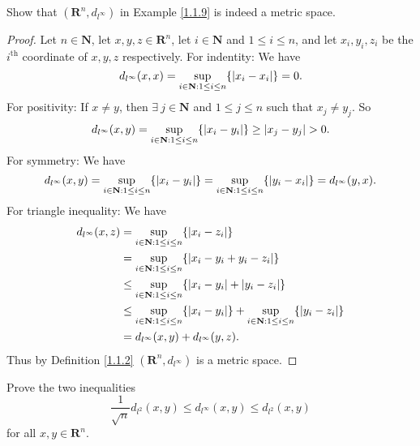 \begin{exercise}\label{ex 1.1.9}
    Show that \((\mathbf{R}^n, d_{l^\infty})\) in Example \ref{1.1.9} is indeed a metric space.
\end{exercise}

\begin{proof}
    Let \(n \in \mathbf{N}\), let \(x, y, z \in \mathbf{R}^n\), let \(i \in \mathbf{N}\) and \(1 \leq i \leq n\), and let \(x_i, y_i, z_i\) be the \(i^{\text{th}}\) coordinate of \(x, y, z\) respectively.
    For indentity:
    We have
    \[
        d_{l^\infty}(x, x) = \sup_{i \in \mathbf{N} : 1 \leq i \leq n} \{\abs*{x_i - x_i}\} = 0.
    \]
    For positivity:
    If \(x \neq y\), then \(\exists\ j \in \mathbf{N}\) and \(1 \leq j \leq n\) such that \(x_j \neq y_j\).
    So
    \[
        d_{l^\infty}(x, y) = \sup_{i \in \mathbf{N} : 1 \leq i \leq n} \{\abs*{x_i - y_i}\} \geq \abs*{x_j - y_j} > 0.
    \]
    For symmetry:
    We have
    \[
        d_{l^\infty}(x, y) = \sup_{i \in \mathbf{N} : 1 \leq i \leq n} \{\abs*{x_i - y_i}\} = \sup_{i \in \mathbf{N} : 1 \leq i \leq n} \{\abs*{y_i - x_i}\} = d_{l^\infty}(y, x).
    \]
    For triangle inequality:
    We have
    \begin{align*}
        d_{l^\infty}(x, z) & = \sup_{i \in \mathbf{N} : 1 \leq i \leq n} \{\abs*{x_i - z_i}\}                                                                     \\
                           & = \sup_{i \in \mathbf{N} : 1 \leq i \leq n} \{\abs*{x_i - y_i + y_i - z_i}\}                                                         \\
                           & \leq \sup_{i \in \mathbf{N} : 1 \leq i \leq n} \{\abs*{x_i - y_i} + \abs*{y_i - z_i}\}                                               \\
                           & \leq \sup_{i \in \mathbf{N} : 1 \leq i \leq n} \{\abs*{x_i - y_i}\} + \sup_{i \in \mathbf{N} : 1 \leq i \leq n} \{\abs*{y_i - z_i}\} \\
                           & = d_{l^\infty}(x, y) + d_{l^\infty}(y, z).
    \end{align*}
    Thus by Definition \ref{1.1.2} \((\mathbf{R}^n, d_{l^\infty})\) is a metric space.
\end{proof}

\begin{exercise}\label{ex 1.1.10}
    Prove the two inequalities
    \[
        \frac{1}{\sqrt{n}} d_{l^2}(x, y) \leq d_{l^\infty}(x, y) \leq d_{l^2}(x, y)
    \]
    for all \(x, y \in \mathbf{R}^n\).
\end{exercise}

